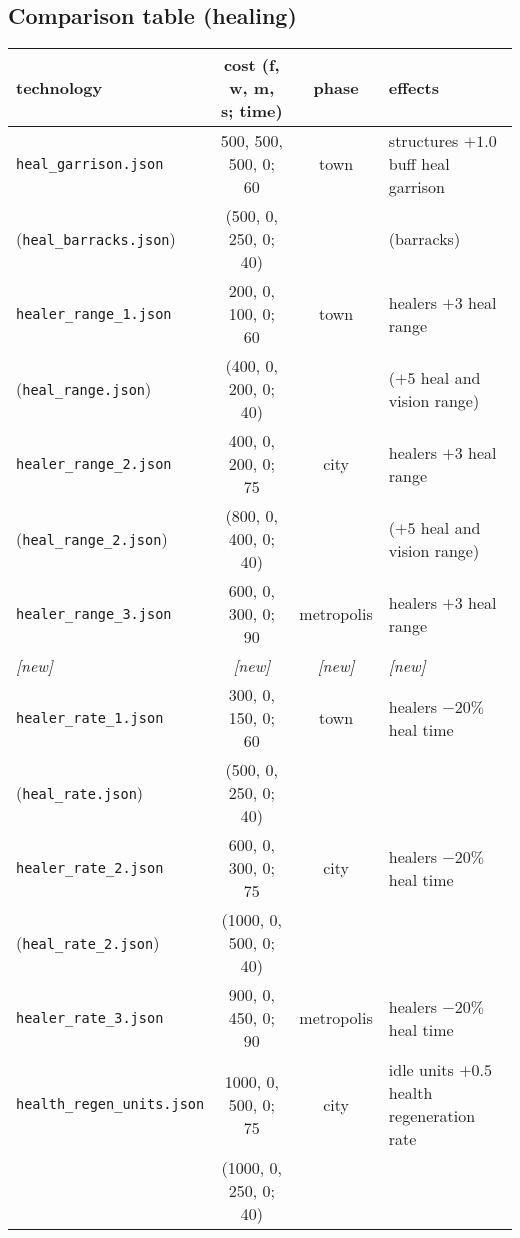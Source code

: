 \documentclass{article}
\begin{document}
\subsection{Comparison table (healing)}
\begin{tabular}{l|cc|l}
{\bf technology} & {{\bf cost} (f, w, m, s; time)} & {\bf phase} & {\bf effects} \\
\hline
\verb+heal_garrison.json+                    &   500,  500,  500,    0;  60  & town       & structures $+1.0$ buff heal garrison \\
(\verb+heal_barracks.json+)                  &  (500,    0,  250,    0;  40) &            & (barracks) \\
\hline
\verb+healer_range_1.json+                   &   200,    0,  100,    0;  60  & town       & healers $+3$ heal range \\
(\verb+heal_range.json+)                     &  (400,    0,  200,    0;  40) &            & ($+5$ heal and vision range) \\
\hline
\verb+healer_range_2.json+                   &   400,    0,  200,    0;  75  & city       & healers $+3$ heal range \\
(\verb+heal_range_2.json+)                   &  (800,    0,  400,    0;  40) &            & ($+5$ heal and vision range) \\
\hline
\verb+healer_range_3.json+                   &   600,    0,  300,    0;  90  & metropolis & healers $+3$ heal range \\
\emph{[new]} & \emph{[new]} & \emph{[new]}   & \emph{[new]} \\
\hline
\verb+healer_rate_1.json+                    &   300,    0,  150,    0;  60  & town       & healers $-20\%$ heal time \\
(\verb+heal_rate.json+)                      &  (500,    0,  250,    0;  40) &            & \\
\hline
\verb+healer_rate_2.json+                    &   600,    0,  300,    0;  75  & city       & healers $-20\%$ heal time \\
(\verb+heal_rate_2.json+)                    & (1000,    0,  500,    0;  40) &            & \\
\hline
\verb+healer_rate_3.json+                    &   900,    0,  450,    0;  90  & metropolis & healers $-20\%$ heal time \\
\hline
\verb+health_regen_units.json+               &  1000,    0,  500,    0;  75  & city       & idle units $+0.5$ health regeneration rate \\
                                             & (1000,    0,  250,    0;  40) &            &  \\
\end{tabular}
\end{document}
